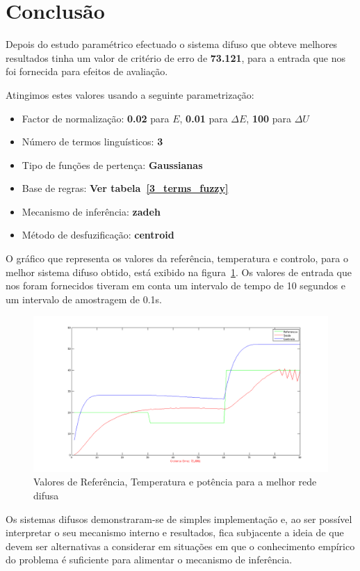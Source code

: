 \documentclass{article}
\begin{document}
\clearpage
\section{Conclusão}
\indent \indent Depois do estudo paramétrico efectuado o sistema difuso que obteve melhores resultados tinha um valor de critério de erro de \textbf{73.121}, para a entrada que nos foi fornecida para efeitos de avaliação.

Atingimos estes valores usando a seguinte parametrização:
\begin{itemize}
\item Factor de normalização: \textbf{0.02} para $E$, \textbf{0.01} para $\Delta E$, \textbf{100} para $\Delta U$
\item Número de termos linguísticos: \textbf{3}
\item Tipo de funções de pertença: \textbf{Gaussianas}
\item Base de regras: \textbf{Ver tabela~\ref{3_terms_fuzzy}}
\item Mecanismo de inferência: \textbf{zadeh}
\item Método de desfuzificação: \textbf{centroid}
\end{itemize}

O gráfico que representa os valores da referência, temperatura e controlo, para o melhor sistema difuso obtido, está exibido na figura~\ref{best_fuzzy_network}. Os valores de entrada que nos foram fornecidos tiveram em conta um intervalo de tempo de 10 segundos e um intervalo de amostragem de 0.1s.

\begin{figure}[h!]
  \centering
  \includegraphics[width=5in]{figures/best_fuzzy_network}
  \caption{Valores de Referência, Temperatura e potência para a melhor rede difusa}
  \label{best_fuzzy_network}
\end{figure}

Os sistemas difusos demonstraram-se de simples implementação e, ao ser possível interpretar o seu mecanismo interno e resultados, fica subjacente a ideia de que devem ser alternativas a considerar em situações em que o conhecimento empírico do problema é suficiente para alimentar o mecanismo de inferência.
\end{document}
